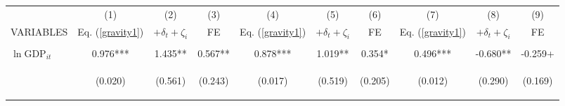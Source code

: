 \begin{center}
\begin{tabular}{lccccccccc} \hline
 & (1) & (2) & (3) & (4) & (5) & (6) & (7) & (8) & (9) \\
VARIABLES & Eq. (\ref{gravity1}) & $+\delta_t+\zeta_i$ & FE & Eq. (\ref{gravity1}) & $+\delta_t+\zeta_i$ & FE & Eq. (\ref{gravity1}) & $+\delta_t+\zeta_i$ & FE \\ \hline
\vspace{4pt} & \begin{footnotesize}\end{footnotesize} & \begin{footnotesize}\end{footnotesize} & \begin{footnotesize}\end{footnotesize} & \begin{footnotesize}\end{footnotesize} & \begin{footnotesize}\end{footnotesize} & \begin{footnotesize}\end{footnotesize} & \begin{footnotesize}\end{footnotesize} & \begin{footnotesize}\end{footnotesize} & \begin{footnotesize}\end{footnotesize} \\
$\ln\text{GDP}_{it}$ & 0.976*** & 1.435** & 0.567** & 0.878*** & 1.019** & 0.354* & 0.496*** & -0.680** & -0.259+ \\
\vspace{4pt} & \begin{footnotesize}(0.020)\end{footnotesize} & \begin{footnotesize}(0.561)\end{footnotesize} & \begin{footnotesize}(0.243)\end{footnotesize} & \begin{footnotesize}(0.017)\end{footnotesize} & \begin{footnotesize}(0.519)\end{footnotesize} & \begin{footnotesize}(0.205)\end{footnotesize} & \begin{footnotesize}(0.012)\end{footnotesize} & \begin{footnotesize}(0.290)\end{footnotesize} & \begin{footnotesize}(0.169)\end{footnotesize} \\

\end{tabular}
\end{center}
